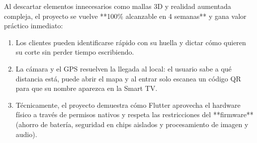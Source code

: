 \documentclass[11pt,a4paper]{article}
\begin{document}
Al descartar elementos innecesarios como mallas 3D y realidad aumentada compleja, el proyecto se vuelve **100\% alcanzable en 4 semanas** y gana valor práctico inmediato:
\begin{enumerate}
    \item Los clientes pueden identificarse rápido con su huella y dictar cómo quieren su corte sin perder tiempo escribiendo.
    \item La cámara y el GPS resuelven la llegada al local: el usuario sabe a qué distancia está, puede abrir el mapa y al entrar solo escanea un código QR para que su nombre aparezca en la Smart TV.
    \item Técnicamente, el proyecto demuestra cómo Flutter aprovecha el hardware físico a través de permisos nativos y respeta las restricciones del **firmware** (ahorro de batería, seguridad en chips aislados y procesamiento de imagen y audio).
\end{enumerate}
\end{document}
